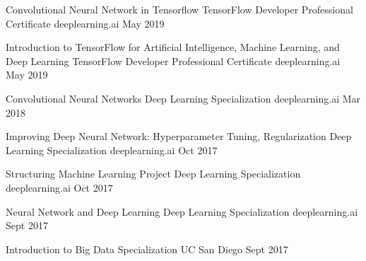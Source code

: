 \begin{cvhonors}



  \cvhonor
    {Convolutional Neural Network in Tensorflow} %
    {TensorFlow Developer Professional Certificate} %
    {deeplearning.ai} %
    {May 2019} %

  \cvhonor
    {Introduction to TensorFlow for Artificial Intelligence, Machine Learning, and Deep Learning} %
    {TensorFlow Developer Professional Certificate} %
    {deeplearning.ai} %
    {May 2019} %

  \cvhonor
    {Convolutional Neural Networks} %
    {Deep Learning Specialization} %
    {deeplearning.ai} %
    {Mar 2018} %

  \cvhonor
    {Improving Deep Neural Network: Hyperparameter Tuning, Regularization} %
    {Deep Learning Specialization} %
    {deeplearning.ai} %
    {Oct 2017} %

  \cvhonor
    {Structuring Machine Learning Project} %
    {Deep Learning Specialization} %
    {deeplearning.ai} %
    {Oct 2017} %

  \cvhonor
    {Neural Network and Deep Learning} %
    {Deep Learning Specialization} %
    {deeplearning.ai} %
    {Sept 2017} %

  \cvhonor
    {Introduction to Big Data} %
    {Specialization} %
    {UC San Diego} %
    {Sept 2017} %

\end{cvhonors}

